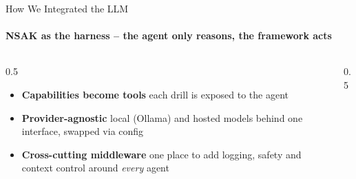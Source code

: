 \begin{frame}{How We Integrated the LLM}
    \framesubtitle{NSAK as the harness -- the agent only reasons, the framework acts}

    \begin{columns}[T,onlytextwidth]
        \begin{column}{0.5\textwidth}
            \begin{itemize}
                \item[\faCogs] \textbf{Capabilities become tools} \scriptsize each drill is exposed to the agent
                \item[\faPlug] \textbf{Provider-agnostic} \scriptsize local (Ollama) and hosted models behind one interface, swapped via config
                \item[\faLayerGroup] \textbf{Cross-cutting middleware} \scriptsize one place to add logging, safety and context control around \emph{every} agent
            \end{itemize}
        \end{column}

        \begin{column}{0.5\textwidth}
        \end{column}
    \end{columns}
\end{frame}


